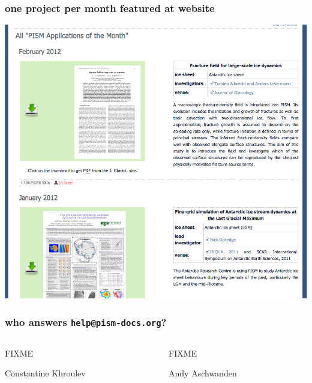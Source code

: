 \documentclass[hide notes,intlimits]{beamer}
\begin{document}
\begin{frame}
  \frametitle{one project per month featured at website}
  \begin{center}
    \includegraphics[height=0.75\textheight]{application-of-the-month.png}
  \end{center}
\end{frame}


\begin{frame}
  \frametitle{who answers \texttt{help@pism-docs.org}?}
  \begin{columns}
    \begin{column}{0.5\textwidth}
      \begin{center}
      FIXME
      
      Constantine Khroulev
      \end{center}
    \end{column}
    \begin{column}{0.5\textwidth}
      \begin{center}
      FIXME
      
      Andy Aschwanden
      \end{center}
    \end{column}
  \end{columns}

\end{frame}
\end{document}
